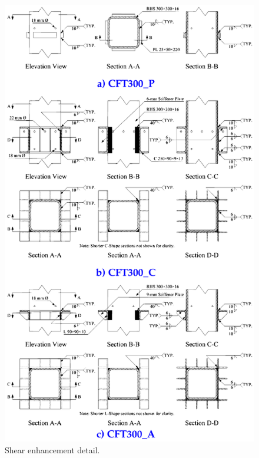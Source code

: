 \documentclass[twocolumn]{article} %
\begin{document}
\begin{figure}\centering
    \includegraphics[width=\columnwidth]{Figures/tikzout/c2020f2.pdf}
    \caption{Shear enhancement detail\citep{chen2020}.}
    \label{c2020f2}
    \end{figure}
\end{document}

